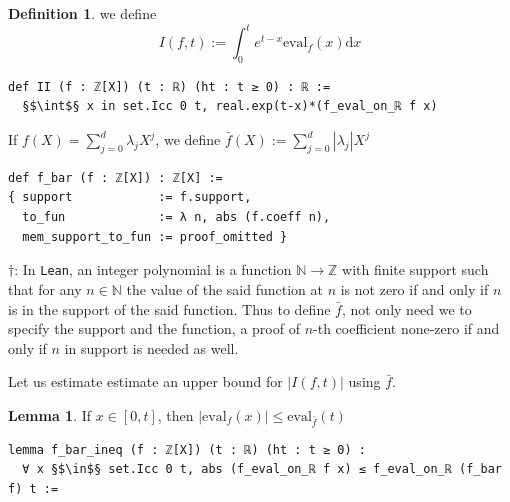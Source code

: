 \documentclass{report}
\theoremstyle{definition}
\newtheorem{lemma}{Lemma}[section]
\newtheorem{definition}{Definition}[section]
\begin{document}


\begin{definition}
we define
$$
I(f,t):=\int_0^t e^{t-x}\mathrm{eval}_f(x)\mathrm{d}x
$$

\begin{verbatim}
def II (f : ℤ[X]) (t : ℝ) (ht : t ≥ 0) : ℝ := 
  §$\int$§ x in set.Icc 0 t, real.exp(t-x)*(f_eval_on_ℝ f x) 
\end{verbatim}

If $f(X)=\sum_{j=0}^d\lambda_j X^j$, we define $\bar f(X):=\sum_{j=0}^d\left|\lambda_j\right|X^j$

\begin{verbatim}
def f_bar (f : ℤ[X]) : ℤ[X] :=
{ support            := f.support,
  to_fun             := λ n, abs (f.coeff n),
  mem_support_to_fun := proof_omitted }
\end{verbatim}
$\dagger$: In {\tt Lean}, an integer polynomial is a function $\mathbb N\to\mathbb Z$ with finite support such that for any $n\in\mathbb N$ the value of the said function at $n$ is not zero if and only if $n$ is in the support of the said function. Thus to define $\bar f$, not only need we to specify the support and the function, a proof of $n$-th coefficient none-zero if and only if $n$ in support is needed as well.
\end{definition}

Let us estimate estimate an upper bound for $\left|I(f,t)\right|$ using $\bar f$.

\begin{lemma}\label{lemma:absf}
If $x\in[0,t]$, then $\left|\mathrm{eval}_f(x)\right|\le\mathrm{eval}_{\bar f}(t)$

\begin{verbatim}
lemma f_bar_ineq (f : ℤ[X]) (t : ℝ) (ht : t ≥ 0) : 
  ∀ x §$\in$§ set.Icc 0 t, abs (f_eval_on_ℝ f x) ≤ f_eval_on_ℝ (f_bar f) t :=
\end{verbatim}
\end{lemma}
\end{document}
